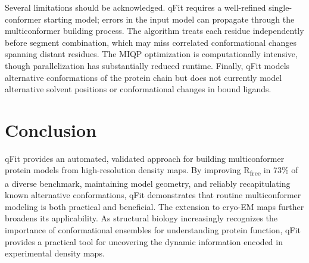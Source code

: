 \documentclass[12pt]{article}
\begin{document}
Several limitations should be acknowledged. qFit requires a well-refined single-conformer starting model; errors in the input model can propagate through the multiconformer building process. The algorithm treats each residue independently before segment combination, which may miss correlated conformational changes spanning distant residues. The MIQP optimization is computationally intensive, though parallelization has substantially reduced runtime. Finally, qFit models alternative conformations of the protein chain but does not currently model alternative solvent positions or conformational changes in bound ligands.

\section{Conclusion}

qFit provides an automated, validated approach for building multiconformer protein models from high-resolution density maps. By improving R\textsubscript{free} in 73\% of a diverse benchmark, maintaining model geometry, and reliably recapitulating known alternative conformations, qFit demonstrates that routine multiconformer modeling is both practical and beneficial. The extension to cryo-EM maps further broadens its applicability. As structural biology increasingly recognizes the importance of conformational ensembles for understanding protein function, qFit provides a practical tool for uncovering the dynamic information encoded in experimental density maps.



\end{document}
